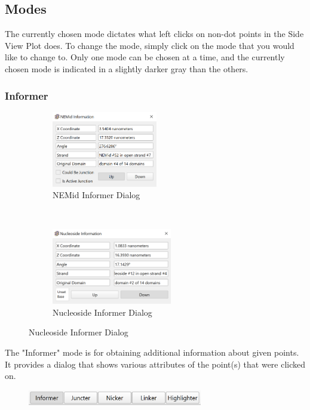 \documentclass[titlepage]{article}
\begin{document}
	\subsection{Modes}
	The currently chosen mode dictates what left clicks on non-dot points in the Side View Plot does. To change the mode, simply click on the mode that you would like to change to. Only one mode can be chosen at a time, and the currently chosen mode is indicated in a slightly darker gray than the others.
	
	\subsubsection{Informer}
	
	\begin{figure}
		\caption{Informer Dialogs}
		\centering
		\begin{subfigure}{.3\textheight}
			\centering
			\includegraphics[height=1.3in]{NEMid-informer.png}
			\caption{NEMid Informer Dialog}
			\label{fig:NEMid-informer}
		\end{subfigure}%
		~
		\begin{subfigure}{.3\textheight}
			\centering
			\includegraphics[height=1.3in]{nucleoside-informer.png}
			\caption{Nucleoside Informer Dialog}
			\label{fig:nucleoside-informer}
		\end{subfigure}
	\end{figure}
	
	The "Informer" mode is for obtaining additional information about given points. It provides a dialog that shows various attributes of the point(s) that were clicked on.
	
	\begin{figure}[h]
		\centering
		\includegraphics[width=3in]{"informer-activated.png"}
		\label{fig:informer-activated}
	\end{figure}
\end{document}
